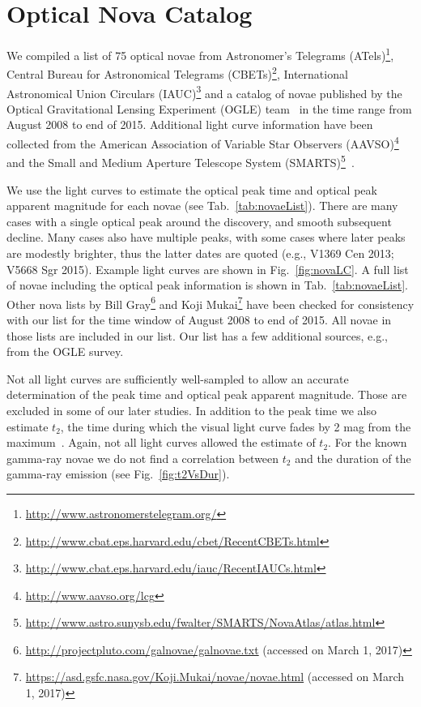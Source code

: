 \documentclass{aa} %
\begin{document}
\section{Optical Nova Catalog}
\label{sec:NovaCat}

We compiled a list of 75 optical novae from Astronomer's Telegrams (ATels)\footnote{\url{http://www.astronomerstelegram.org/}}, Central Bureau for Astronomical Telegrams (CBETs)\footnote{\url{http://www.cbat.eps.harvard.edu/cbet/RecentCBETs.html}}, International Astronomical Union Circulars (IAUC)\footnote{\url{http://www.cbat.eps.harvard.edu/iauc/RecentIAUCs.html}} and a catalog of novae published by the Optical Gravitational Lensing Experiment (OGLE) team~\citep{OGLEREF1,OGLEREF2}
in the time range from August 2008 to end of 2015. Additional light curve information have been collected from the American Association of Variable Star Observers (AAVSO)\footnote{\url{http://www.aavso.org/lcg}} and the Small and Medium Aperture Telescope System (SMARTS)\footnote{\url{http://www.astro.sunysb.edu/fwalter/SMARTS/NovaAtlas/atlas.html}}~\citep{2012PASP..124.1057W}. 

We use the light curves to estimate the optical peak time and optical peak apparent magnitude for each novae (see Tab.~\ref{tab:novaeList}). There are many cases with a single optical peak around the discovery, and smooth subsequent decline. Many cases also have multiple peaks, with some cases where later peaks are modestly brighter, thus the latter dates are quoted (e.g., V1369 Cen 2013; V5668 Sgr 2015). Example light curves are shown in Fig.~\ref{fig:novaLC}. A full list of novae including the optical peak information is shown in Tab.~\ref{tab:novaeList}. Other nova lists by Bill Gray\footnote{\url{http://projectpluto.com/galnovae/galnovae.txt} (accessed on March 1, 2017)} and Koji Mukai\footnote{\url{https://asd.gsfc.nasa.gov/Koji.Mukai/novae/novae.html} (accessed on March 1, 2017)} have been checked for consistency with our list for the time window of August 2008 to end of 2015. All novae in those lists are included in our list. Our list has a few additional sources, e.g., from the OGLE survey.

Not all light curves are sufficiently well-sampled to allow an accurate determination of the peak time and optical peak apparent magnitude. Those are excluded in some of our later studies. In addition to the peak time we also estimate $t_2$, the time during which the visual light curve fades by 2 mag from the maximum~\citep{1964gano.book.....P}. Again, not all light curves allowed the estimate of $t_2$. For the known gamma-ray novae we do not find a correlation between $t_2$ and the duration of the gamma-ray emission (see Fig.~\ref{fig:t2VsDur}).
\end{document}
